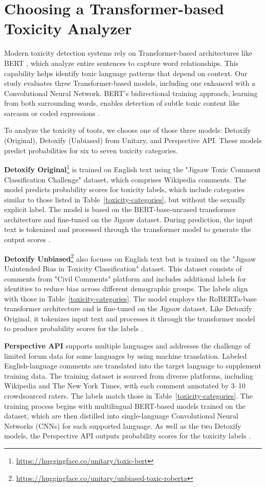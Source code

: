 \chapter{Choosing a Transformer-based Toxicity Analyzer} \label{choosing-toxicity-analyzer}
Modern toxicity detection systems rely on Transformer-based architectures like BERT \cite{devlin:2019}, which analyze entire sentences to capture word relationships. This capability helps identify toxic language patterns that depend on context. Our study evaluates three Transformer-based models, including one enhanced with a Convolutional Neural Network. BERT's bidirectional training approach, learning from both surrounding words, enables detection of subtle toxic content like sarcasm or coded expressions \cite{mathew:2021}.

To analyze the toxicity of toots, we choose one of those three models: Detoxify (Original), Detoxify (Unbiased) from Unitary, and Perspective API. These models predict probabilities for six to seven toxicity categories.

\textbf{Detoxify Original}\footnote{\url{https://huggingface.co/unitary/toxic-bert}} is trained on English text using the "Jigsaw Toxic Comment Classification Challenge" dataset, which comprises Wikipedia comments. The model predicts probability scores for toxicity labels, which include categories similar to those listed in Table~\ref{toxicity-categories}, but without the sexually explicit label. The model is based on the BERT-base-uncased transformer architecture and fine-tuned on the Jigsaw dataset. During prediction, the input text is tokenized and processed through the transformer model to generate the output scores \cite{detoxify:medium}.

\textbf{Detoxify Unbiased}\footnote{\url{https://huggingface.co/unitary/unbiased-toxic-roberta}} also focuses on English text but is trained on the "Jigsaw Unintended Bias in Toxicity Classification" dataset. This dataset consists of comments from "Civil Comments" platform and includes additional labels for identities to reduce bias across different demographic groups. The labels align with those in Table~\ref{toxicity-categories}. The model employs the RoBERTa-base~\cite{liu:2019} transformer architecture and is fine-tuned on the Jigsaw dataset. Like Detoxify Original, it tokenizes input text and processes it through the transformer model to produce probability scores for the labels \cite{detoxify:medium}.

\textbf{Perspective API} supports multiple languages and addresses the challenge of limited forum data for some languages by using machine translation. Labeled English-language comments are translated into the target language to supplement training data. The training dataset is sourced from diverse platforms, including Wikipedia and The New York Times, with each comment annotated by 3--10 crowdsourced raters. The labels match those in Table~\ref{toxicity-categories}. The training process begins with multilingual BERT-based models trained on the dataset, which are then distilled into single-language Convolutional Neural Networks (CNNs) for each supported language. As well as the two Detoxify models, the Perspective API outputs probability scores for the toxicity labels \cite{lees:2022}.

